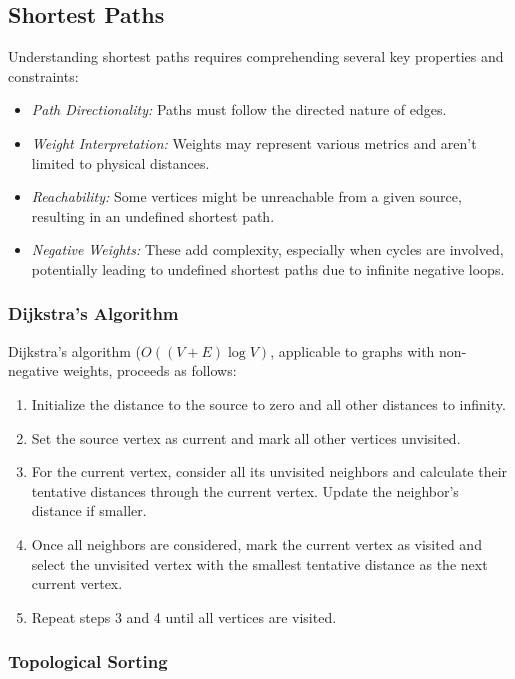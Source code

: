 \documentclass{article}
\begin{document}
\subsection{Shortest Paths}

Understanding shortest paths requires comprehending several key properties and constraints:

\begin{itemize}
    \item \textit{Path Directionality:} Paths must follow the directed nature of edges.
    \item \textit{Weight Interpretation:} Weights may represent various metrics and aren't limited to physical distances.
    \item \textit{Reachability:} Some vertices might be unreachable from a given source, resulting in an undefined shortest path.
    \item \textit{Negative Weights:} These add complexity, especially when cycles are involved, potentially leading to undefined shortest paths due to infinite negative loops.
\end{itemize}

\subsubsection{Dijkstra's Algorithm}

Dijkstra's algorithm ($O((V + E) \log V)$, applicable to graphs with non-negative weights, proceeds as follows:
\begin{enumerate}
    \item Initialize the distance to the source to zero and all other distances to infinity.
    \item Set the source vertex as current and mark all other vertices unvisited.
    \item For the current vertex, consider all its unvisited neighbors and calculate their tentative distances through the current vertex. Update the neighbor's distance if smaller.
    \item Once all neighbors are considered, mark the current vertex as visited and select the unvisited vertex with the smallest tentative distance as the next current vertex.
    \item Repeat steps 3 and 4 until all vertices are visited.
\end{enumerate}

\subsubsection{Topological Sorting}
\end{document}
